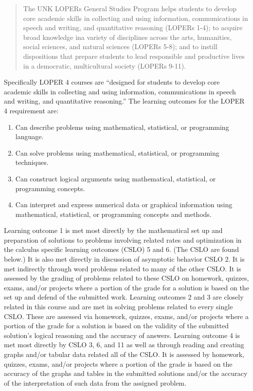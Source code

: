 \documentclass[12pt]{article}
\newcounter{ex}\setcounter{ex}{0}
\begin{document}
\begin{quote}
The UNK LOPERs General Studies Program helps students to develop core academic skills in collecting and using information, communications in speech and writing, and quantitative reasoning (LOPERs 1-4); to acquire broad knowledge ina variety of disciplines across the arts, humanities, social sciences, and natural sciences (LOPERs 5-8); and to instill dispositions that prepare students to lead responsible and productive lives in a democratic, multicultural society (LOPERs 9-11).
\end{quote}

Specifically LOPER 4 courses are ``designed for students to develop core academic skills in collecting and using information, communications in speech and writing, and quantitative reasoning.” The learning outcomes for the LOPER 4 requirement are:
\begin{enumerate}
    \item  Can describe problems using mathematical, statistical, or programming language.

     \item Can solve problems using mathematical, statistical, or programming techniques.

    \item Can construct logical arguments using mathematical, statistical, or programming concepts.

    \item Can interpret and express numerical data or graphical information using mathematical, statistical, or programming concepts and methods.
   \end{enumerate}
   
Learning outcome 1 is met most directly by the mathematical set up and preparation of solutions to problems involving related rates and optimization in the calculus specific learning outcomes (CSLO) 5 and 6. (The CSLO are found below.) It is also met directly in discussion of asymptotic behavior CSLO 2. It is met indirectly through word problems related to many of the other CSLO. It is assessed by the grading of problems related to these CSLO on homework, quizzes, exams, and/or projects where a portion of the grade for a solution is based on the set up and defend of the submitted work.
Learning outcomes 2 and 3 are closely related in this course and are met in solving problems related to every single CSLO. These are assessed via homework, quizzes, exams, and/or projects where a portion of the grade for a solution is based on the validity of the submitted solution’s logical reasoning and the accuracy of answers.
Learning outcome 4 is met most directly by CSLO 3, 6, and 11 as well as through reading and creating graphs and/or tabular data related all of the CSLO. It is assessed by homework, quizzes, exams, and/or projects where a portion of the grade is based on the accuracy of the graphs and tables in the submitted solutions and/or the accuracy of the interpretation of such data from the assigned problem.
\end{document}
